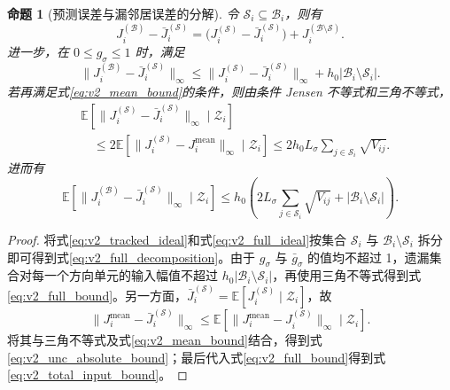 \documentclass[UTF8,fontset=windows,11pt]{ctexart}
\newtheorem{proposition}[theorem]{命题}
\newcommand{\E}{\mathbb E}
\begin{document}
\begin{proposition}[预测误差与漏邻居误差的分解]
\label{prop:v2_full_decomposition}
令 $\mathcal S_i\subseteq\mathcal B_i$，则有
\begin{equation}
 J_i^{(\mathcal B)}-\bar J_i^{(\mathcal S)}
 =\bigl(J_i^{(\mathcal S)}-\bar J_i^{(\mathcal S)}\bigr)
 +J_i^{(\mathcal B\setminus\mathcal S)}.
 \label{eq:v2_full_decomposition}
\end{equation}
进一步，在 $0\le g_\sigma\le1$ 时，满足
\begin{equation}
 \|J_i^{(\mathcal B)}-\bar J_i^{(\mathcal S)}\|_\infty
 \le
 \|J_i^{(\mathcal S)}-\bar J_i^{(\mathcal S)}\|_\infty
 +h_0|\mathcal B_i\setminus\mathcal S_i|.
 \label{eq:v2_full_bound}
\end{equation}
若再满足式\eqref{eq:v2_mean_bound}的条件，则由条件 Jensen 不等式和三角不等式，
\begin{equation}
 \begin{aligned}
 &\E[\|J_i^{(\mathcal S)}-\bar J_i^{(\mathcal S)}\|_\infty\mid\mathcal Z_i]\\
 &\quad\le
 2\E[\|J_i^{(\mathcal S)}-J_i^{\mathrm{mean}}\|_\infty\mid\mathcal Z_i]
 \le2h_0L_\sigma\sum_{j\in\mathcal S_i}\sqrt{V_{ij}}.
 \end{aligned}
 \label{eq:v2_unc_absolute_bound}
\end{equation}
进而有
\begin{equation}
 \E[\|J_i^{(\mathcal B)}-\bar J_i^{(\mathcal S)}\|_\infty\mid\mathcal Z_i]
 \le h_0\left(
 2L_\sigma\sum_{j\in\mathcal S_i}\sqrt{V_{ij}}
 +|\mathcal B_i\setminus\mathcal S_i|
 \right).
 \label{eq:v2_total_input_bound}
\end{equation}
\end{proposition}

\begin{proof}
将式\eqref{eq:v2_tracked_ideal}和式\eqref{eq:v2_full_ideal}按集合 $\mathcal S_i$ 与 $\mathcal B_i\setminus\mathcal S_i$ 拆分即可得到式\eqref{eq:v2_full_decomposition}。由于 $g_\sigma$ 与 $\bar g_\sigma$ 的值均不超过 1，遗漏集合对每一个方向单元的输入幅值不超过 $h_0|\mathcal B_i\setminus\mathcal S_i|$，再使用三角不等式得到式\eqref{eq:v2_full_bound}。另一方面，$\bar J_i^{(\mathcal S)}=\E[J_i^{(\mathcal S)}\mid\mathcal Z_i]$，故
\[
 \|J_i^{\mathrm{mean}}-\bar J_i^{(\mathcal S)}\|_\infty
 \le\E[\|J_i^{\mathrm{mean}}-J_i^{(\mathcal S)}\|_\infty\mid\mathcal Z_i].
\]
将其与三角不等式及式\eqref{eq:v2_mean_bound}结合，得到式\eqref{eq:v2_unc_absolute_bound}；最后代入式\eqref{eq:v2_full_bound}得到式\eqref{eq:v2_total_input_bound}。
\end{proof}
\end{document}
